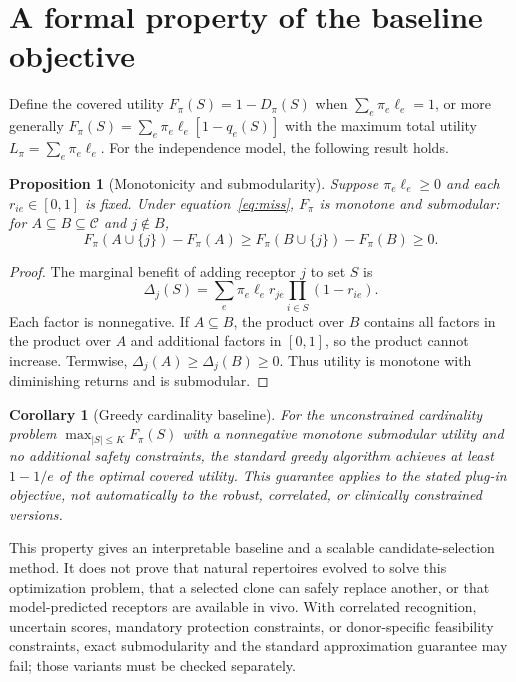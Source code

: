 \documentclass[11pt]{article}
\newtheorem{proposition}{Proposition}
\newtheorem{corollary}{Corollary}
\begin{document}
\section{A formal property of the baseline objective}
Define the covered utility $F_\pi(S)=1-D_\pi(S)$ when $\sum_e\pi_e\ell_e=1$, or more generally $F_\pi(S)=\sum_e\pi_e\ell_e[1-q_e(S)]$ with the maximum total utility $L_\pi=\sum_e\pi_e\ell_e$. For the independence model, the following result holds.

\begin{proposition}[Monotonicity and submodularity]
Suppose $\pi_e\ell_e\geq0$ and each $r_{ie}\in[0,1]$ is fixed. Under equation~\eqref{eq:miss}, $F_\pi$ is monotone and submodular: for $A\subseteq B\subseteq\mathcal{C}$ and $j\notin B$,
\begin{equation}
F_\pi(A\cup\{j\})-F_\pi(A)\geq F_\pi(B\cup\{j\})-F_\pi(B)\geq0.
\label{eq:diminishing}
\end{equation}
\end{proposition}
\begin{proof}
The marginal benefit of adding receptor $j$ to set $S$ is
\begin{equation}
\Delta_j(S)=\sum_e\pi_e\ell_e r_{je}\prod_{i\in S}(1-r_{ie}).
\label{eq:marginal}
\end{equation}
Each factor is nonnegative. If $A\subseteq B$, the product over $B$ contains all factors in the product over $A$ and additional factors in $[0,1]$, so the product cannot increase. Termwise, $\Delta_j(A)\geq\Delta_j(B)\geq0$. Thus utility is monotone with diminishing returns and is submodular.
\end{proof}

\begin{corollary}[Greedy cardinality baseline]
For the unconstrained cardinality problem $\max_{|S|\leq K}F_\pi(S)$ with a nonnegative monotone submodular utility and no additional safety constraints, the standard greedy algorithm achieves at least $1-1/e$ of the optimal covered utility. This guarantee applies to the stated plug-in objective, not automatically to the robust, correlated, or clinically constrained versions.
\end{corollary}

This property gives an interpretable baseline and a scalable candidate-selection method. It does not prove that natural repertoires evolved to solve this optimization problem, that a selected clone can safely replace another, or that model-predicted receptors are available in vivo. With correlated recognition, uncertain scores, mandatory protection constraints, or donor-specific feasibility constraints, exact submodularity and the standard approximation guarantee may fail; those variants must be checked separately.
\end{document}
